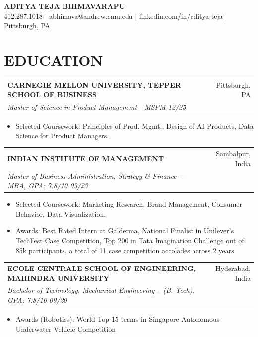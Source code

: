 \documentclass[10pt,letterpaper]{article}
\makeatletter
\newcommand{\resumeEntry}[4]{%
  \begin{tabularx}{\textwidth}{@{}Xr@{}}
    \textbf{#1} #2 & #3 \\
    \textit{#4} & \\
  \end{tabularx}
}
\makeatother
\begin{document}
\begin{center}
  {\LARGE \textbf{ADITYA TEJA BHIMAVARAPU}}\\
  412.287.1018 $|$ abhimava@andrew.cmu.edu $|$ linkedin.com/in/aditya-teja $|$ Pittsburgh, PA
\end{center}

\section*{EDUCATION}
\resumeEntry{CARNEGIE MELLON UNIVERSITY, TEPPER SCHOOL OF BUSINESS}{}{Pittsburgh, PA}{Master of Science in Product Management - MSPM \hfill 12/25}
\begin{itemize}
  \item Selected Coursework: Principles of Prod. Mgmt., Design of AI Products, Data Science for Product Managers.
\end{itemize}

\resumeEntry{INDIAN INSTITUTE OF MANAGEMENT}{}{Sambalpur, India}{Master of Business Administration, Strategy \& Finance -- MBA, GPA: 7.8/10 \hfill 03/23}
\begin{itemize}
  \item Selected Coursework: Marketing Research, Brand Management, Consumer Behavior, Data Visualization.
  \item Awards: Best Rated Intern at Galderma, National Finalist in Unilever's TechFest Case Competition, Top 200 in Tata Imagination Challenge out of 85k participants, a total of 11 case competition accolades across 2 years
\end{itemize}

\resumeEntry{ECOLE CENTRALE SCHOOL OF ENGINEERING, MAHINDRA UNIVERSITY}{}{Hyderabad, India}{Bachelor of Technology, Mechanical Engineering -- (B. Tech), GPA: 7.8/10 \hfill 09/20}
\begin{itemize}
  \item Awards (Robotics): World Top 15 teams in Singapore Autonomous Underwater Vehicle Competition
\end{itemize}

\end{document}
